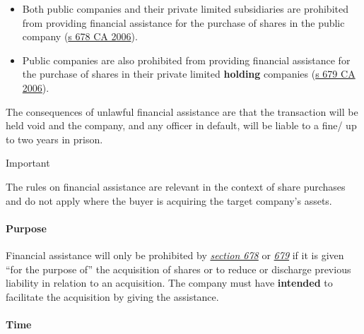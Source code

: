 \documentclass[
]{article}
\providecommand{\tightlist}{%
  \setlength{\itemsep}{0pt}\setlength{\parskip}{0pt}}
\newenvironment{env-be598745-44b1-4815-8875-ed2abeb511dd}
{
    \savenotes\tcolorbox[blanker,breakable,left=5pt,borderline west={2pt}{-4pt}{cyan}]
}
{
    \endtcolorbox\spewnotes
}
\begin{document}
\begin{itemize}
\tightlist
\item
  Both public companies and their private limited subsidiaries are
  prohibited from providing financial assistance for the purchase of
  shares in the public company
  (\href{https://www.legislation.gov.uk/ukpga/2006/46/section/678}{s 678
  CA 2006}).
\item
  Public companies are also prohibited from providing financial
  assistance for the purchase of shares in their private limited
  \textbf{holding} companies
  (\href{https://www.legislation.gov.uk/ukpga/2006/46/section/679}{s 679
  CA 2006}).
\end{itemize}

The consequences of unlawful financial assistance are that the
transaction will be held void and the company, and any officer in
default, will be liable to a fine/ up to two years in prison.

\begin{env-be598745-44b1-4815-8875-ed2abeb511dd}

Important

The rules on financial assistance are relevant in the context of share
purchases and do not apply where the buyer is acquiring the target
company's assets.

\end{env-be598745-44b1-4815-8875-ed2abeb511dd}

\hypertarget{purpose}{%
\paragraph{Purpose}\label{purpose}}

Financial assistance will only be prohibited by
\emph{\href{https://uk.westlaw.com/5-505-7258?originationContext=document\&transitionType=PLDocumentLink\&contextData=(sc.Default)\&ppcid=52c063520c5f48d8a198d13504dc80c1}{section
678}} or
\emph{\href{https://uk.westlaw.com/6-506-2056?originationContext=document\&transitionType=PLDocumentLink\&contextData=(sc.Default)\&ppcid=52c063520c5f48d8a198d13504dc80c1}{679}}
if it is given ``for the purpose of'' the acquisition of shares or to
reduce or discharge previous liability in relation to an acquisition.
The company must have \textbf{intended} to facilitate the acquisition by
giving the assistance.

\hypertarget{time}{%
\paragraph{Time}\label{time}}
\end{document}

